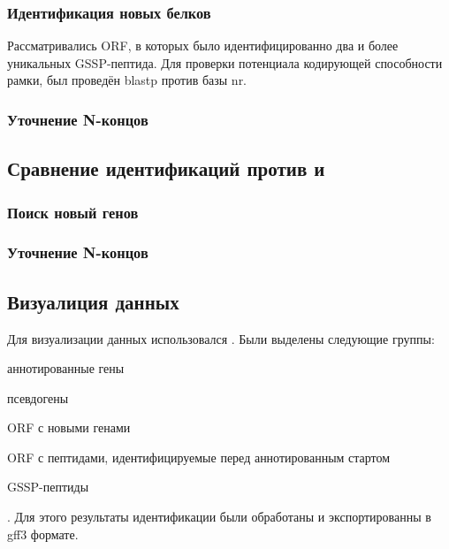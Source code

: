 \subsubsection{Идентификация новых белков}
Рассматривались ORF, в которых было идентифицированно два и более уникальных GSSP-пептида. Для проверки потенциала кодирующей способности рамки, был проведён blastp против базы nr. 

\subsubsection{Уточнение N-концов}

\subsection{Сравнение идентификаций против  и }

\subsubsection{Поиск новый генов}

\subsubsection{Уточнение N-концов}

\subsection{Визуалиция данных}
Для визуализации данных использовался . Были выделены следующие группы: 
\begin{inparaenum}
    \item аннотированные гены
    \item псевдогены
    \item ORF с новыми генами
    \item ORF с пептидами, идентифицируемые перед аннотированным стартом
    \item GSSP-пептиды
\end{inparaenum}. Для этого результаты идентификации были обработаны и экспортированны в gff3 формате.


\newpage
